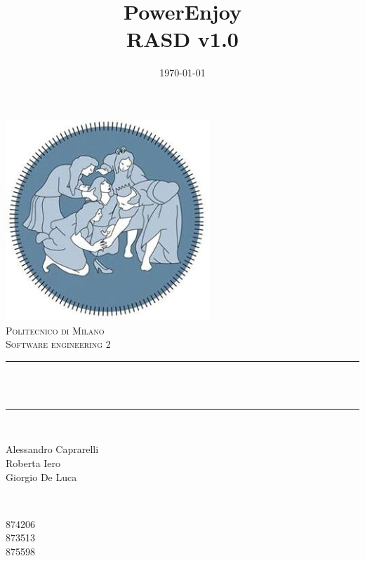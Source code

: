 \documentclass[12pt]{report}
\title{PowerEnjoy\\RASD v1.0}                             %
\date{\today}                                           %
\makeatletter
\let\thetitle\@title
\let\thedate\@date
\makeatother
\begin{document}

\begin{titlepage}
    \centering
    \vspace*{0.5 cm}
    \includegraphics[scale = 0.75]{images/poli.jpg}\\[1.0 cm]   %
    \textsc{\LARGE Politecnico di Milano}\\[2.0 cm]   %
    \textsc{\large Software engineering 2}\\[0.5 cm]               %
    \rule{\linewidth}{0.2 mm} \\[0.4 cm]
    { \huge \bfseries \thetitle}\\
    \rule{\linewidth}{0.2 mm} \\[1.5 cm]
    
    \begin{minipage}{0.4\textwidth}
        \begin{flushleft} \large
            Alessandro Caprarelli \\
	 Roberta Iero \\
	 Giorgio De Luca
	
            \end{flushleft}
            \end{minipage}~ 
            \begin{minipage}{0.4\textwidth}
            \begin{flushright} \large
            874206  \\
            873513 \\
            875598
        \end{flushright}
    \end{minipage}\\[2 cm]
    
    {\large \thedate}\\[2 cm]
 
    \vfill
    
\end{titlepage}


\tableofcontents
\pagebreak







\end{document}
